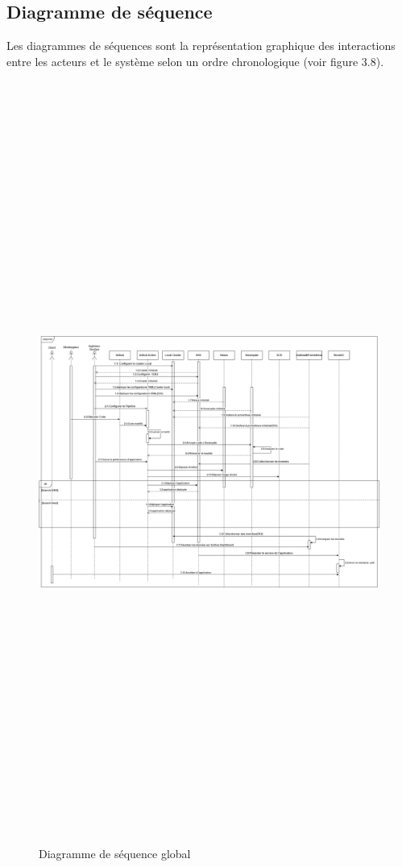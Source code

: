 \subsection{\Large Diagramme de séquence}
\textsf{\selectfont{} Les diagrammes de séquences sont la représentation graphique des interactions entre les acteurs et le système selon un ordre chronologique (voir figure 3.8).\cite{14}}
\begin{figure}[H]
  \begin{center}
  
      \includegraphics[height=25cm,width=19cm]{Squence.drawio.png}

  \end{center}
  
  \caption{Diagramme de séquence global}
\end{figure}
